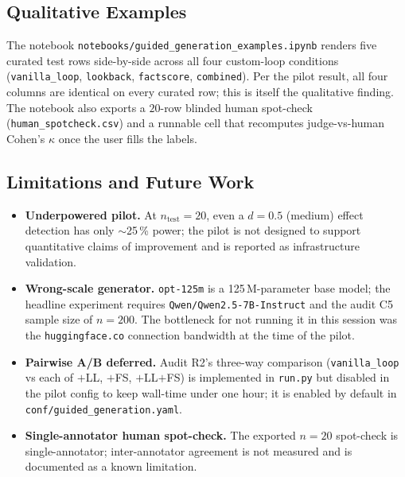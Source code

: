 \subsection{Qualitative Examples}

The notebook \texttt{notebooks/guided\_generation\_examples.ipynb} renders
five curated test rows side-by-side across all four custom-loop conditions
(\texttt{vanilla\_loop}, \texttt{lookback}, \texttt{factscore},
\texttt{combined}).  Per the pilot result, all four columns are identical on
every curated row; this is itself the qualitative finding.  The notebook
also exports a $20$-row blinded human spot-check
(\texttt{human\_spotcheck.csv}) and a runnable cell that recomputes
judge-vs-human Cohen's $\kappa$ once the user fills the labels.

\subsection{Limitations and Future Work}

\begin{itemize}
\item \textbf{Underpowered pilot.} At $n_{\text{test}}=20$, even a $d=0.5$
(medium) effect detection has only $\sim$25\,\% power; the pilot is not
designed to support quantitative claims of improvement and is reported as
infrastructure validation.
\item \textbf{Wrong-scale generator.} \texttt{opt-125m} is a 125\,M-parameter
base model; the headline experiment requires
\texttt{Qwen/Qwen2.5-7B-Instruct} and the audit C5 sample size of $n=200$.
The bottleneck for not running it in this session was the
\texttt{huggingface.co} connection bandwidth at the time of the pilot.
\item \textbf{Pairwise A/B deferred.} Audit R2's three-way comparison
(\texttt{vanilla\_loop} vs each of $+$LL, $+$FS, $+$LL$+$FS) is implemented
in \texttt{run.py} but disabled in the pilot config to keep wall-time under
one hour; it is enabled by default in
\texttt{conf/guided\_generation.yaml}.
\item \textbf{Single-annotator human spot-check.} The exported $n=20$
spot-check is single-annotator; inter-annotator agreement is not measured
and is documented as a known limitation.
\end{itemize}
